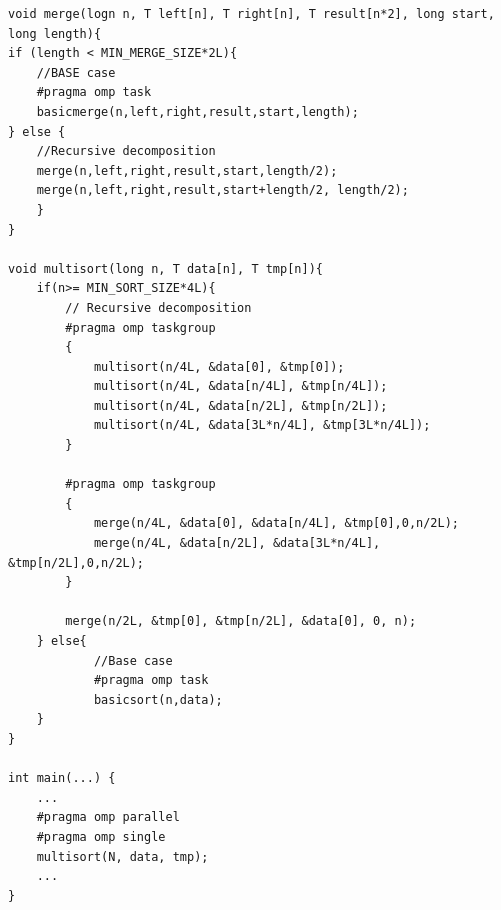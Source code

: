 \documentclass[12]{article}
\begin{document}
\begin{lstlisting}[frame=single]
void merge(logn n, T left[n], T right[n], T result[n*2], long start, long length){
if (length < MIN_MERGE_SIZE*2L){
    //BASE case
    #pragma omp task
    basicmerge(n,left,right,result,start,length);
} else {
    //Recursive decomposition
    merge(n,left,right,result,start,length/2);
    merge(n,left,right,result,start+length/2, length/2);
    }
}

void multisort(long n, T data[n], T tmp[n]){
    if(n>= MIN_SORT_SIZE*4L){
        // Recursive decomposition
        #pragma omp taskgroup
        {
            multisort(n/4L, &data[0], &tmp[0]);
            multisort(n/4L, &data[n/4L], &tmp[n/4L]);
            multisort(n/4L, &data[n/2L], &tmp[n/2L]);
            multisort(n/4L, &data[3L*n/4L], &tmp[3L*n/4L]);
        }
        
        #pragma omp taskgroup
        {
            merge(n/4L, &data[0], &data[n/4L], &tmp[0],0,n/2L);
            merge(n/4L, &data[n/2L], &data[3L*n/4L], &tmp[n/2L],0,n/2L);
        }
        
        merge(n/2L, &tmp[0], &tmp[n/2L], &data[0], 0, n);
    } else{
            //Base case
            #pragma omp task
            basicsort(n,data);
    }
}

int main(...) {
    ...
    #pragma omp parallel
    #pragma omp single
    multisort(N, data, tmp);
    ...
}
\end{lstlisting}
\medskip
\end{document}
